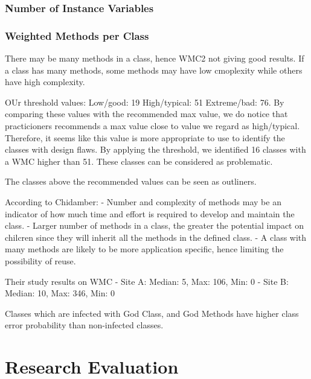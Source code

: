 \subsubsection{Number of Instance Variables}



\subsubsection{Weighted Methods per Class}
There may be many methods in a class, hence WMC2 not giving good results. If a class has many methods, some methods may have low cmoplexity while others have high complexity.

OUr threshold values: Low/good: 19				High/typical: 51	Extreme/bad: 76. By comparing these values with the recommended max value, we do notice that practicioners recommends a max value close to value we regard as high/typical. Therefore, it seems like this value is more appropriate to use to identify the classes with design flaws. By applying the threshold, we identified 16 classes with a WMC higher than 51. These classes can be considered as problematic.


The classes above the recommended values can be seen as outliners. 

According to Chidamber: 
- Number and complexity of methods may be an indicator of how much time and effort is required to develop and maintain the class.
- Larger number of methods in a class, the greater the potential impact on chilcren since they will inherit all the methods in the defined class.
- A class with many methods are likely to be more application specific, hence limiting the possibility of reuse.

Their study results on WMC
- Site A: Median: 5, Max: 106, Min: 0
- Site B: Median: 10, Max: 346, Min: 0




Classes which are infected with God Class, and God Methods have higher class error probability than non-infected classes.




\section{Research Evaluation}


